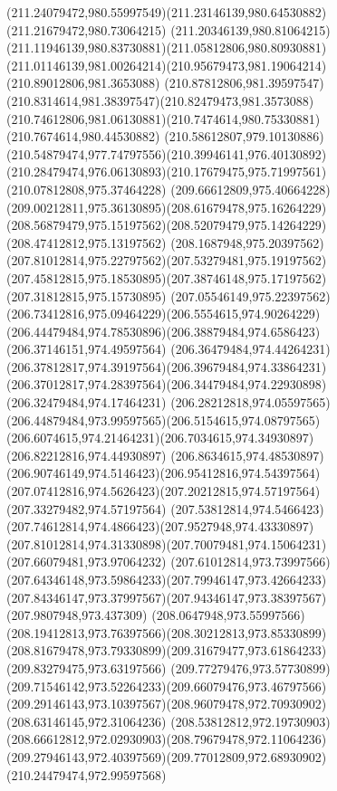 {{		\curveto(211.24079472,980.55997549)(211.23146139,980.64530882)(211.21679472,980.73064215)
		\curveto(211.20346139,980.81064215)(211.11946139,980.83730881)(211.05812806,980.80930881)
		\curveto(211.01146139,981.00264214)(210.95679473,981.19064214)(210.89012806,981.3653088)
		\curveto(210.87812806,981.39597547)(210.8314614,981.38397547)(210.82479473,981.3573088)
		\curveto(210.74612806,981.06130881)(210.7474614,980.75330881)(210.7674614,980.44530882)
		\curveto(210.58612807,979.10130886)(210.54879474,977.74797556)(210.39946141,976.40130892)
		\curveto(210.28479474,976.06130893)(210.17679475,975.71997561)(210.07812808,975.37464228)
		\curveto(209.66612809,975.40664228)(209.00212811,975.36130895)(208.61679478,975.16264229)
		\curveto(208.56879479,975.15197562)(208.52079479,975.14264229)(208.47412812,975.13197562)
		\curveto(208.1687948,975.20397562)(207.81012814,975.22797562)(207.53279481,975.19197562)
		\curveto(207.45812815,975.18530895)(207.38746148,975.17197562)(207.31812815,975.15730895)
		\curveto(207.05546149,975.22397562)(206.73412816,975.09464229)(206.5554615,974.90264229)
		\curveto(206.44479484,974.78530896)(206.38879484,974.6586423)(206.37146151,974.49597564)
		\curveto(206.36479484,974.44264231)(206.37812817,974.39197564)(206.39679484,974.33864231)
		\curveto(206.37012817,974.28397564)(206.34479484,974.22930898)(206.32479484,974.17464231)
		\curveto(206.28212818,974.05597565)(206.44879484,973.99597565)(206.5154615,974.08797565)
		\curveto(206.6074615,974.21464231)(206.7034615,974.34930897)(206.82212816,974.44930897)
		\curveto(206.8634615,974.48530897)(206.90746149,974.5146423)(206.95412816,974.54397564)
		\curveto(207.07412816,974.5626423)(207.20212815,974.57197564)(207.33279482,974.57197564)
		\curveto(207.53812814,974.5466423)(207.74612814,974.4866423)(207.9527948,974.43330897)
		\curveto(207.81012814,974.31330898)(207.70079481,974.15064231)(207.66079481,973.97064232)
		\curveto(207.61012814,973.73997566)(207.64346148,973.59864233)(207.79946147,973.42664233)
		\curveto(207.84346147,973.37997567)(207.94346147,973.38397567)(207.9807948,973.437309)
		\curveto(208.0647948,973.55997566)(208.19412813,973.76397566)(208.30212813,973.85330899)
		\curveto(208.81679478,973.79330899)(209.31679477,973.61864233)(209.83279475,973.63197566)
		\curveto(209.77279476,973.57730899)(209.71546142,973.52264233)(209.66079476,973.46797566)
		\curveto(209.29146143,973.10397567)(208.96079478,972.70930902)(208.63146145,972.31064236)
		\curveto(208.53812812,972.19730903)(208.66612812,972.02930903)(208.79679478,972.11064236)
		\curveto(209.27946143,972.40397569)(209.77012809,972.68930902)(210.24479474,972.99597568)
}}
